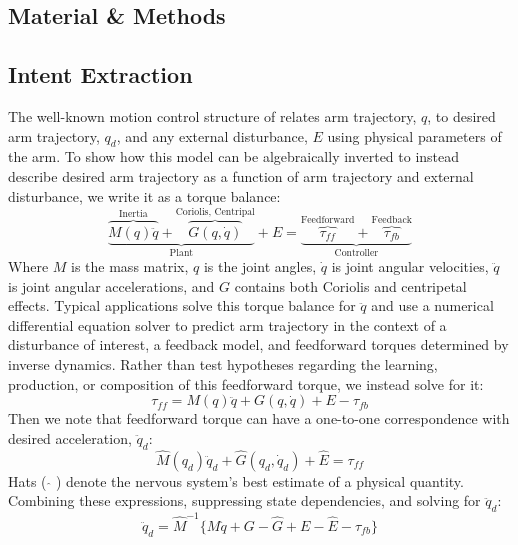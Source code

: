 \documentclass{frontiersSCNS} %
\begin{document}
\begin{methods}
\section{Material \& Methods}

\subsection{Intent Extraction}
The well-known motion control structure of \cite{shadmehr1994adaptive} relates arm trajectory, $q$, to desired arm trajectory, $q_d$, and any external disturbance, $E$ using physical parameters of the arm. To show how this model can be algebraically inverted to instead describe desired arm trajectory as a function of arm trajectory and external disturbance, we write it as a torque balance:
\begin{equation}
\underbrace{\overbrace{M(q)\ddot{q}}^{\text{Inertia}}+\overbrace{G(q,\dot{q})}^{\text{Coriolis, Centripal}}}_{\text{Plant}}+E=
\underbrace{\overbrace{\tau_{ff}}^{\text{Feedforward}}+\overbrace{\tau_{fb}}^{\text{Feedback}}}_\text{Controller}
\end{equation}
Where $M$ is the mass matrix, $q$ is the joint angles, $\dot{q}$ is joint angular velocities, $\ddot{q}$ is joint angular accelerations, and $G$ contains both Coriolis and centripetal effects. Typical applications solve this torque balance for $\ddot{q}$ and use a numerical differential equation solver to predict arm trajectory in the context of a disturbance of interest, a feedback model, and feedforward torques determined by inverse dynamics. Rather than test hypotheses regarding the learning, production, or composition of this feedforward torque, we instead solve for it:
\begin{equation}
\tau_{ff}=M(q)\ddot{q}+G(q,\dot{q})+E-\tau_{fb}
\end{equation}
Then we note that feedforward torque can have a one-to-one correspondence with desired acceleration, $\ddot{q}_d$:
\begin{equation}
\hat{M}(q_d)\ddot{q}_d+\hat{G}(q_d,\dot{q}_d)+\hat{E}=\tau_{ff}
\end{equation}
Hats ( $\hat{}$ ) denote the nervous system's best estimate of a physical quantity. Combining these expressions, suppressing state dependencies, and solving for $\ddot{q}_d$:
\begin{equation}
\ddot{q}_d=\hat{M}^{-1} \{M\ddot{q}+G-\hat{G}+E-\hat{E}-\tau_{fb}\}
\end{equation}

\end{methods}
\end{document}
